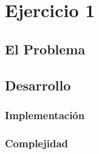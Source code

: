 \section{Ejercicio 1}
\subsection{El Problema}
\subsection{Desarrollo}
\subsubsection{Implementación}
\subsubsection{Complejidad}
